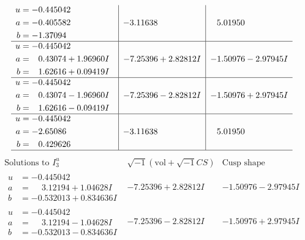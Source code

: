 \documentclass[1p]{elsarticle_modified}
\theoremstyle{definition}
\newcommand{\I}{\sqrt{-1}}
\begin{document}
$$\begin{array}{c|c|c}
\begin{aligned}
u &= -0.445042\phantom{ +0.000000I} \\
a &= -0.405582\phantom{ +0.000000I} \\
b &= -1.37094\phantom{ +0.000000I}\end{aligned}
 & -3.11638\phantom{ +0.000000I} & \phantom{-}5.01950\phantom{ +0.000000I} \\ \hline\begin{aligned}
u &= -0.445042\phantom{ +0.000000I} \\
a &= \phantom{-}0.43074 + 1.96960 I \\
b &= \phantom{-}1.62616 + 0.09419 I\end{aligned}
 & -7.25396 + 2.82812 I & -1.50976 - 2.97945 I \\ \hline\begin{aligned}
u &= -0.445042\phantom{ +0.000000I} \\
a &= \phantom{-}0.43074 - 1.96960 I \\
b &= \phantom{-}1.62616 - 0.09419 I\end{aligned}
 & -7.25396 - 2.82812 I & -1.50976 + 2.97945 I \\ \hline\begin{aligned}
u &= -0.445042\phantom{ +0.000000I} \\
a &= -2.65086\phantom{ +0.000000I} \\
b &= \phantom{-}0.429626\phantom{ +0.000000I}\end{aligned}
 & -3.11638\phantom{ +0.000000I} & \phantom{-}5.01950\phantom{ +0.000000I}\\
 \hline 
 \end{array}$$\newpage$$\begin{array}{c|c|c}  
\text{Solutions to }I^u_{3}& \I (\text{vol} + \sqrt{-1}CS) & \text{Cusp shape}\\
 \hline 
\begin{aligned}
u &= -0.445042\phantom{ +0.000000I} \\
a &= \phantom{-}3.12194 + 1.04628 I \\
b &= -0.532013 + 0.834636 I\end{aligned}
 & -7.25396 + 2.82812 I & -1.50976 - 2.97945 I \\ \hline\begin{aligned}
u &= -0.445042\phantom{ +0.000000I} \\
a &= \phantom{-}3.12194 - 1.04628 I \\
b &= -0.532013 - 0.834636 I\end{aligned}
 & -7.25396 - 2.82812 I & -1.50976 + 2.97945 I \\ \hline\begin{aligned}

\end{aligned}
\end{array}$$
\end{document}
